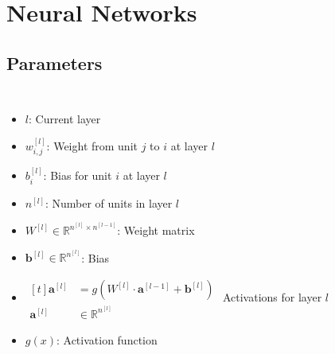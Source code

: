 \section{Neural Networks}
\begin{frame}{\insertsec}
	
\end{frame}

\subsection{Parameters}
\begin{frame}{\insertsubsec}
    \begin{columns}[t]
        \begin{itemize}
            \item $l$: Current layer
            \item $w_{i, j}^{[l]}$: Weight from unit $j$ to $i$ at layer $l$
            \item $b_{i}^{[l]}$: Bias for unit $i$ at layer $l$
            \item $n^{[l]}$: Number of units in layer $l$
            \item $W^{[l]} \in \mathbb{R}^{n^{[l]} \times n^{[l - 1]}}$: Weight matrix
            \item $\bm{b}^{[l]} \in \mathbb{R}^{n^{[l]}}$: Bias
            \item $
            \begin{aligned}[t]
                \bm{a}^{[l]} &= g(W^{[l]}\cdot \bm{a}^{[l - 1]} + \bm{b}^{[l]}) \\
                \bm{a}^{[l]} &\in \mathbb{R}^{n^{[l]}}
            \end{aligned}
            $ Activations for layer $l$
            \item $g(x)$: Activation function
        \end{itemize}
        \centering
        
    \end{columns}
\end{frame}
